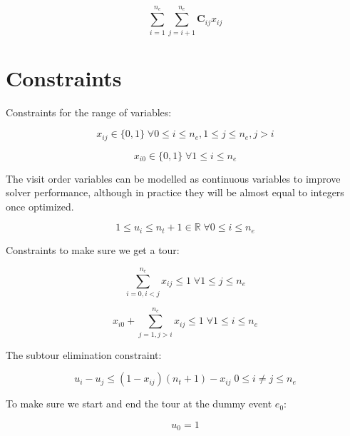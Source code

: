 \documentclass[11pt]{article}
\begin{document}
\begin{equation} \label{eq:objective}
\sum_{i=1}^{n_e} \sum_{j=i+1}^{n_e} \mathbf{C}_{ij} x_{ij}
\end{equation}

\section{Constraints}
Constraints for the range of variables:

\begin{equation} \label{constr:x}
    x_{ij} \in \{0, 1\} \; \forall 0 \leq i \leq n_e, 1 \leq j \leq n_e, j > i
\end{equation}

\begin{equation} \label{constr:x_dummy}
    x_{i0} \in \{0, 1\} \; \forall 1 \leq i \leq n_e
\end{equation}

The visit order variables can be modelled as continuous variables to improve solver performance, although in practice they will be almost equal to integers once optimized.

\begin{equation} \label{constr:u}
    1 \leq u_i \leq n_t + 1 \in \mathbb{R} \; \forall 0 \leq i \leq n_e
\end{equation}

Constraints to make sure we get a tour:

\begin{equation} \label{constr:in_edge}
    \sum_{i=0, i < j}^{n_e} x_{ij} \leq 1 \; \forall 1 \leq j \leq n_e
\end{equation}

\begin{equation} \label{constr:out_edge}
    x_{i0} + \sum_{j=1, j > i}^{n_e} x_{ij} \leq 1 \; \forall 1 \leq i \leq n_e
\end{equation}

The subtour elimination constraint:

\begin{equation} \label{constr:order}
    u_i - u_j \leq (1 - x_{ij})(n_t + 1) - x_{ij} \; 0 \leq i \neq j \leq n_e
\end{equation}

To make sure we start and end the tour at the dummy event $e_0$:

\begin{equation} \label{constr:start}
    u_0 = 1
\end{equation}
\end{document}
